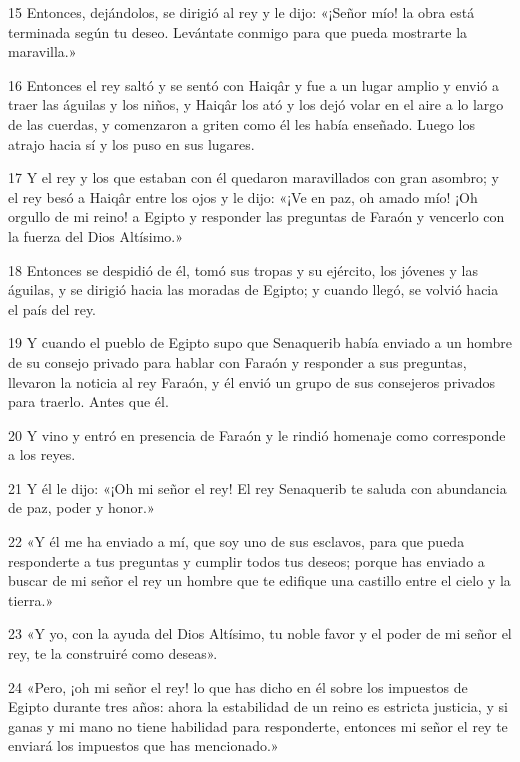 \par 15 Entonces, dejándolos, se dirigió al rey y le dijo: «¡Señor mío! la obra está terminada según tu deseo. Levántate conmigo para que pueda mostrarte la maravilla.»

\par 16 Entonces el rey saltó y se sentó con Haiqâr y fue a un lugar amplio y envió a traer las águilas y los niños, y Haiqâr los ató y los dejó volar en el aire a lo largo de las cuerdas, y comenzaron a griten como él les había enseñado. Luego los atrajo hacia sí y los puso en sus lugares.

\par 17 Y el rey y los que estaban con él quedaron maravillados con gran asombro; y el rey besó a Haiqâr entre los ojos y le dijo: «¡Ve en paz, oh amado mío! ¡Oh orgullo de mi reino! a Egipto y responder las preguntas de Faraón y vencerlo con la fuerza del Dios Altísimo.»

\par 18 Entonces se despidió de él, tomó sus tropas y su ejército, los jóvenes y las águilas, y se dirigió hacia las moradas de Egipto; y cuando llegó, se volvió hacia el país del rey.

\par 19 Y cuando el pueblo de Egipto supo que Senaquerib había enviado a un hombre de su consejo privado para hablar con Faraón y responder a sus preguntas, llevaron la noticia al rey Faraón, y él envió un grupo de sus consejeros privados para traerlo. Antes que él.

\par 20 Y vino y entró en presencia de Faraón y le rindió homenaje como corresponde a los reyes.

\par 21 Y él le dijo: «¡Oh mi señor el rey! El rey Senaquerib te saluda con abundancia de paz, poder y honor.»

\par 22 «Y él me ha enviado a mí, que soy uno de sus esclavos, para que pueda responderte a tus preguntas y cumplir todos tus deseos; porque has enviado a buscar de mi señor el rey un hombre que te edifique una castillo entre el cielo y la tierra.»

\par 23 «Y yo, con la ayuda del Dios Altísimo, tu noble favor y el poder de mi señor el rey, te la construiré como deseas».

\par 24 «Pero, ¡oh mi señor el rey! lo que has dicho en él sobre los impuestos de Egipto durante tres años: ahora la estabilidad de un reino es estricta justicia, y si ganas y mi mano no tiene habilidad para responderte, entonces mi señor el rey te enviará los impuestos que has mencionado.»

